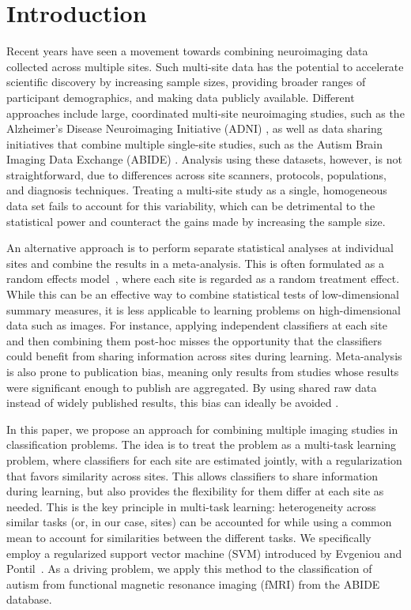 \documentclass{llncs}
\begin{document}
\section{Introduction}
Recent years have seen a movement towards combining neuroimaging data collected
across multiple sites. Such multi-site data has the potential to accelerate
scientific discovery by increasing sample sizes, providing broader ranges of
participant demographics, and making data publicly available. Different
approaches include large, coordinated multi-site neuroimaging studies, such as
the Alzheimer's Disease Neuroimaging Initiative (ADNI) \cite{adni}, as well as
data sharing initiatives that combine multiple single-site studies, such as the
Autism Brain Imaging Data Exchange (ABIDE) \cite{abide}. Analysis using these
datasets, however, is not straightforward, due to differences across site
scanners, protocols, populations, and diagnosis techniques. Treating a
multi-site study as a single, homogeneous data set fails to account for this
variability, which can be detrimental to the statistical power and counteract
the gains made by increasing the sample size.

An alternative approach is to perform separate statistical analyses at
individual sites and combine the results in a meta-analysis. This is often
formulated as a random effects model~\cite{DerSimonian}, where each site is
regarded as a random treatment effect. While this can be an effective way to
combine statistical tests of low-dimensional summary measures, it is less
applicable to learning problems on high-dimensional data such as images. For
instance, applying independent classifiers at each site and then combining them
post-hoc misses the opportunity that the classifiers could benefit from sharing
information across sites during learning.  Meta-analysis is also prone to publication bias, meaning only results from 
studies whose results were significant enough to publish are aggregated.  By using shared raw data instead of widely 
published results, this bias can ideally be avoided \cite{meta}. 

In this paper, we propose an approach for combining multiple imaging studies in
classification problems. The idea is to treat the problem as a multi-task
learning problem, where classifiers for each site are estimated jointly, with a
regularization that favors similarity across sites. This allows classifiers to
share information during learning, but also provides the flexibility for them
differ at each site as needed. This is the key principle in multi-task learning:
heterogeneity across similar tasks (or, in our case, sites) can be accounted for
while using a common mean to account for similarities between the different
tasks. We specifically employ a regularized support vector machine (SVM)
introduced by Evgeniou and Pontil~\cite{regMTL}. As a driving problem, we
apply this method to the classification of autism from functional magnetic
resonance imaging (fMRI) from the ABIDE database.
\end{document}
